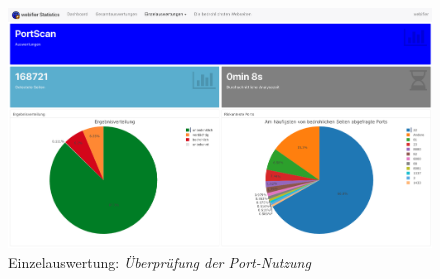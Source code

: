 \begin{landscape}
\begin{figure}[H]
  \centering
  \includegraphics[width=\textheight]{images/stats/portscan}
  \caption{Einzelauswertung: \textit{Überprüfung der Port-Nutzung}}
\end{figure}

\end{landscape}
